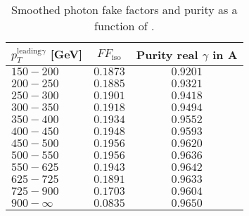 \begin{table}[ht!]
    \caption{Smoothed photon fake factors \ffiso and \gammajet purity as a function of \ptgam.}
    \begin{tabular}{lcc}
        \toprule
        \(p_{T}^{\text{leading} \gamma}\) [GeV] & \(FF_{\text{iso}}\) &  Purity real \(\gamma\) in A \\
        \midrule
        $150-200$    & $0.1873$ & $0.9201$ \\
        $200-250$    & $0.1885$ & $0.9321$ \\
        $250-300$    & $0.1901$ & $0.9418$ \\
        $300-350$    & $0.1918$ & $0.9494$ \\
        $350-400$    & $0.1934$ & $0.9552$ \\
        $400-450$    & $0.1948$ & $0.9593$ \\
        $450-500$    & $0.1956$ & $0.9620$ \\
        $500-550$    & $0.1956$ & $0.9636$ \\
        $550-625$    & $0.1943$ & $0.9642$ \\
        $625-725$    & $0.1891$ & $0.9633$ \\
        $725-900$    & $0.1703$ & $0.9604$ \\
        $900-\infty$ & $0.0835$ & $0.9650$ \\
        \bottomrule
    \end{tabular}
    \label{tab:bkg:estimation:results:ffiso_purity_values}
    \centering
\end{table}
